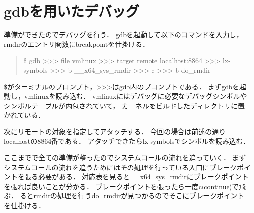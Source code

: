 \section{gdbを用いたデバッグ}
準備ができたのでデバッグを行う．
gdbを起動して以下のコマンドを入力し，rmdirのエントリ関数にbreakpointを仕掛ける．
\begin{quote}
\$ gdb 
>>> file vmlinux
>>> target remote localhost:8864
>>> lx-symbols
>>> b \_\_x64\_sys\_rmdir 
>>> c
>>> b do\_rmdir 
\end{quote}

\$がターミナルのプロンプト，>>>はgdb内のプロンプトである．
まずgdbを起動し，vmlinuxを読み込む．
vmlinuxにはデバッグに必要なデバッグシンボルやシンボルテーブルが内包されていて，
カーネルをビルドしたディレクトリに置かれている．

次にリモートの対象を指定してアタッチする．
今回の場合は前述の通りlocalhostの8864番である．
アタッチできたらlx-symbolsでシンボルを読み込む．

ここまでで全ての準備が整ったのでシステムコールの流れを追っていく．
まずシステムコールの流れを追うためにはその処理を行っている入口にブレークポイントを張る必要がある．
対応表を見ると\_\_x64\_sys\_rmdirにブレークポイントを張れば良いことが分かる．\cite{syscall}
ブレークポイントを張ったら一度c(continue)で飛ぶ．
るとrmdirの処理を行うdo\_rmdirが見つかるのでそこにブレークポイントを仕掛ける．


